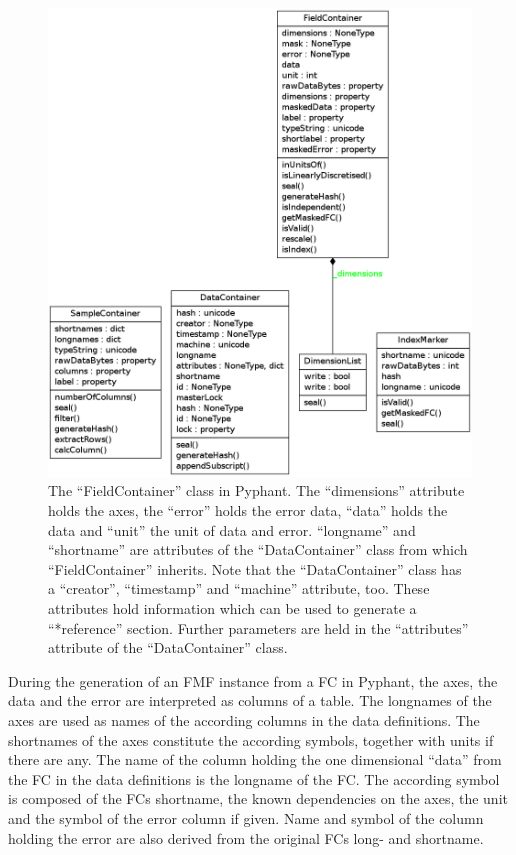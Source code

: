 \documentclass[10pt,utf8, mainlanguage=english]{ufcd-info}
\begin{document}
\begin{figure}
\includegraphics[width=\textwidth]{./classes_data_containers}
\caption{The \enquote{FieldContainer} class in Pyphant. The \enquote{dimensions} attribute holds the axes, the \enquote{error} holds the error data, \enquote{data} holds the data and \enquote{unit} the unit of data and error. \enquote{longname} and \enquote{shortname} are attributes of the \enquote{DataContainer} class from which \enquote{FieldContainer} inherits. Note that the \enquote{DataContainer} class has a \enquote{creator}, \enquote{timestamp} and \enquote{machine} attribute, too. These attributes hold information which can be used to generate a \enquote{*reference} section. Further parameters are held in the \enquote{attributes} attribute of the \enquote{DataContainer} class.}
\label{fig:class_field_container}
\end{figure}

During the generation of an FMF instance from a FC in Pyphant, the axes, the data and the error are interpreted as columns of a table. The longnames of the axes are used as names of the according columns in the data definitions. The shortnames of the axes constitute the according symbols, together with units if there are any. The name of the column holding the one dimensional \enquote{data} from the FC in the data definitions is the longname of the FC. The according  symbol is composed of the FCs shortname, the known dependencies on the axes, the unit and the symbol of the error column if given. Name and symbol of the column holding the error are also derived from the original FCs long- and shortname.
\end{document}
